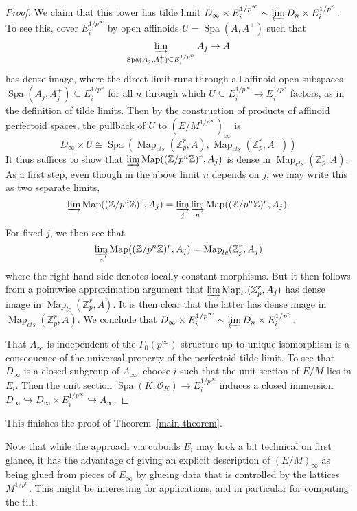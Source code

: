 \documentclass[10pt,oneside]{amsart}
\theoremstyle{definition}
\begin{document}
\begin{proof}
	 We claim that this tower has tilde limit $D_\infty\times E_i^{1/p^\infty} \sim \varprojlim D_n\times E_i^{1/p^n}$.
	 To see this, cover $E_i^{1/p^\infty}$ by open affinoids $U=\operatorname{Spa}(A,A^{+})$ such that 
	 \[\varinjlim_{\operatorname{Spa}(A_{j},A_{j}^{+})\subseteq E_i^{1/p^n}} A_{j} \rightarrow A \]
	 has dense image, where the direct limit runs through all affinoid open subspaces $\operatorname{Spa}(A_{j},A_{j}^{+})\subseteq E_i^{1/p^n}$ for all $n$ through which $U\subseteq E_i^{1/p^\infty}\rightarrow E_i^{1/p^n}$ factors, as in the definition of tilde limits. Then by the construction of products of affinoid perfectoid spaces, the pullback of $U$ to $(E/M^{1/p^\infty})_\infty$ is 
	\[D_\infty\times U \cong \operatorname{Spa}(\operatorname{Map}_{cts}(\mathbb Z_p^r,A),\operatorname{Map}_{cts}(\mathbb Z_p^r,A^+))\]
	 It thus suffices to show that $\varinjlim \operatorname{Map}((\mathbb Z/p^n\mathbb Z)^r,A_{j})$ is dense in $\operatorname{Map}_{cts}(\mathbb Z_p^r,A)$.
	 As a first step, even though in the above limit $n$ depends on $j$, we may write this as two separate limits, 
	 \[\varinjlim \operatorname{Map}((\mathbb Z/p^n\mathbb Z)^r,A_{j}) = \varinjlim_{j} \varinjlim_n \operatorname{Map}(\mathbb (\mathbb Z/p^n\mathbb Z)^r,A_{j}).\]
	 For fixed $j$, we then see that 
	 \[\varinjlim_{n} \operatorname{Map}((\mathbb Z/p^n\mathbb Z)^r,A_j)=\operatorname{Map}_{lc}(\mathbb Z_p^r,A_j)\] where the right hand side denotes locally constant morphisms. But it then follows from a pointwise approximation argument that $\varinjlim\operatorname{Map}_{lc}(\mathbb Z_p^r,A_j)$ has dense image in $\operatorname{Map}_{lc}(\mathbb Z_p^r,A)$. It is then clear that the latter has dense image in $\operatorname{Map}_{cts}(\mathbb Z_p^r,A)$. We conclude that $D_\infty\times E_i^{1/p^\infty} \sim \varprojlim D_n\times E_i^{1/p^n}$.
	 
	That $A_\infty$ is independent of the $\Gamma_0(p^\infty)$-structure up to unique isomorphism is a consequence of the universal property of the perfectoid tilde-limit. To see that $D_\infty$ is a closed subgroup of $A_\infty$, choose $i$ such that the unit section of $E/M$ lies in $E_i$. Then the unit section $\operatorname{Spa}(K,\mathcal O_K)\rightarrow E_i^{1/p^\infty}$ induces a closed immersion $D_\infty\hookrightarrow D_\infty \times E_i^{1/p^\infty}\hookrightarrow A_\infty$.
	\end{proof}
	
	This finishes the proof of Theorem~\ref{main theorem}.
	
	Note that while the approach via cuboids $E_i$ may look a bit technical on first glance, it has the advantage of giving an explicit description of $(E/M)_\infty$ as being glued from pieces of $E_\infty$ by glueing data that is controlled by the lattices $M^{1/p^n}$. This might be interesting for applications, and in particular for computing the tilt. 
	
\end{document}
